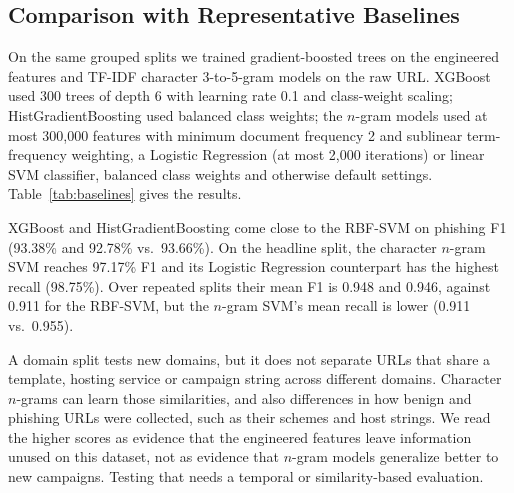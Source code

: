 \documentclass[conference]{IEEEtran}
\begin{document}
\subsection{Comparison with Representative Baselines}
\label{sec:baselines}
On the same grouped splits we trained gradient-boosted trees on the engineered features and TF-IDF character 3-to-5-gram models on the raw URL. XGBoost~\cite{chen2016xgboost} used 300 trees of depth 6 with learning rate 0.1 and class-weight scaling; HistGradientBoosting used balanced class weights; the $n$-gram models used at most 300{,}000 features with minimum document frequency 2 and sublinear term-frequency weighting, a Logistic Regression (at most 2{,}000 iterations) or linear SVM classifier, balanced class weights and otherwise default settings. Table~\ref{tab:baselines} gives the results.

XGBoost and HistGradientBoosting come close to the RBF-SVM on phishing F1 (93.38\% and 92.78\% vs.\ 93.66\%). On the headline split, the character $n$-gram SVM reaches 97.17\% F1 and its Logistic Regression counterpart has the highest recall (98.75\%). Over repeated splits their mean F1 is 0.948 and 0.946, against 0.911 for the RBF-SVM, but the $n$-gram SVM's mean recall is lower (0.911 vs.\ 0.955).

A domain split tests new domains, but it does not separate URLs that share a template, hosting service or campaign string across different domains. Character $n$-grams can learn those similarities, and also differences in how benign and phishing URLs were collected, such as their schemes and host strings. We read the higher scores as evidence that the engineered features leave information unused on this dataset, not as evidence that $n$-gram models generalize better to new campaigns. Testing that needs a temporal or similarity-based evaluation.

\begin{table}[htbp]
\centering
\caption{Baselines under the Same Domain-Grouped Protocol. Left: Headline Split (\%). Right: Mean $\pm$ SD over Five Repeated Splits}
\label{tab:baselines}
\small
{}
\end{table}
\end{document}
